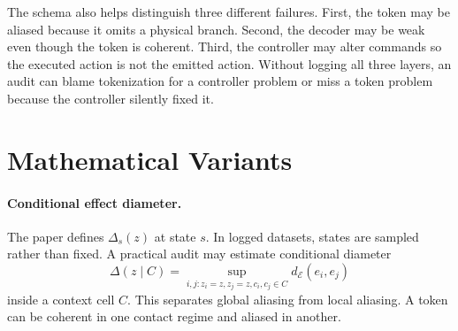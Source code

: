 \documentclass{article}
\newcommand{\E}{\mathcal{E}}
\begin{document}
\begin{table}[h]
\centering
\caption{Suggested logging schema for an action-fiber audit.}
\label{tab:logschema}
\end{table}

The schema also helps distinguish three different failures. First, the token may
be aliased because it omits a physical branch. Second, the decoder may be weak
even though the token is coherent. Third, the controller may alter commands so
the executed action is not the emitted action. Without logging all three layers,
an audit can blame tokenization for a controller problem or miss a token problem
because the controller silently fixed it.

\section{Mathematical Variants}

\paragraph{Conditional effect diameter.}
The paper defines $\Delta_s(z)$ at state $s$. In logged datasets, states are
sampled rather than fixed. A practical audit may estimate conditional diameter
\[
    \Delta(z\mid C)=
    \sup_{i,j:z_i=z,z_j=z,c_i,c_j\in C}
    d_\E(e_i,e_j)
\]
inside a context cell $C$. This separates global aliasing from local aliasing.
A token can be coherent in one contact regime and aliased in another.
\end{document}

